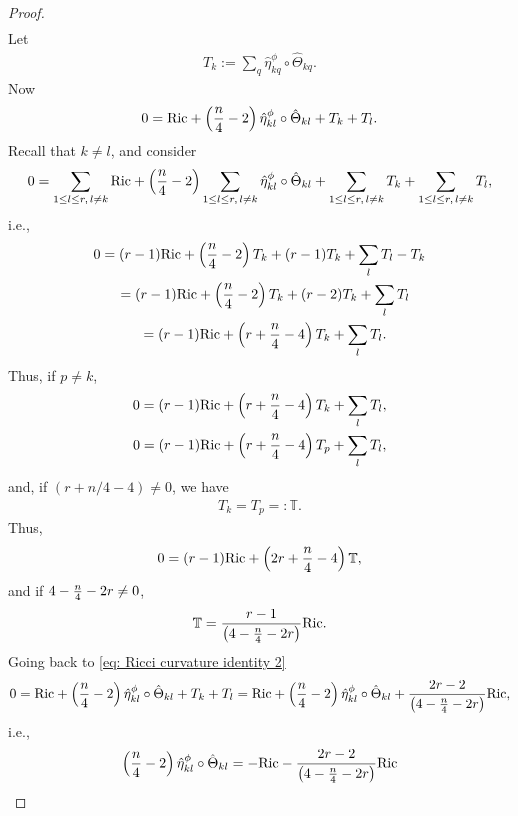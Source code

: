 \documentclass[pdftex]{sigma}
\numberwithin{equation}{section}
\begin{document}
\begin{proof}
\begin{gather*}
\end{gather*}
Let
\begin{gather*}T_k:=\sum_q \hat{\eta}^\phi_{kq}\circ\hat\Theta_{kq}.\end{gather*}
Now
\begin{gather}
0={\rm Ric} + \left({n\over 4}-2\right)\hat\eta_{kl}^\phi\circ\hat\Theta_{kl} + T_k + T_l . \label{eq: Ricci curvature identity 2}
\end{gather}
Recall that $k\not = l$, and consider
\begin{gather*}
0=\sum_{1\leq l\leq r,\,l\not= k} {\rm Ric} +\left({n\over 4}-2\right)\sum_{1\leq l\leq r,\,l\not= k}\hat\eta_{kl}^\phi\circ\hat\Theta_{kl}
 +\sum_{1\leq l\leq r,\,l\not= k} T_k + \sum_{1\leq l\leq r,\,l\not= k} T_l,
\end{gather*}
i.e.,
\begin{gather*}
0 = (r-1) {\rm Ric}+ \left({n\over 4}-2\right)T_k +(r-1) T_k + \sum_{l} T_l - T_k\\
\hphantom{0}{} = (r-1) {\rm Ric}+ \left({n\over 4}-2\right)T_k +(r-2) T_k + \sum_l T_l\\
\hphantom{0}{} = (r-1) {\rm Ric}+ \left(r+{n\over 4}-4\right)T_k + \sum_l T_l.
\end{gather*}
Thus, if $p\not =k$,
\begin{gather*}
0 =(r-1) {\rm Ric}+ \left(r+{n\over 4}-4\right)T_k + \sum_l T_l,\\
0 =(r-1) {\rm Ric}+ \left(r+{n\over 4}-4\right)T_p + \sum_l T_l,
\end{gather*}
and, if $(r+n/4-4)\not =0$, we have
\begin{gather*}T_k=T_p=:\mathbb{T}.\end{gather*}
Thus,
\begin{gather*}
0=(r-1) {\rm Ric}+\left(2r+{n\over 4}-4\right)\mathbb{T} ,
\end{gather*}
and if $4-{n\over 4}-2r\not=0$,
\begin{gather*}
 \mathbb{T}= {r-1\over \left(4-{n\over 4}-2r\right)} {\rm Ric} .
\end{gather*}
Going back to \eqref{eq: Ricci curvature identity 2}
\begin{gather*}
0 ={\rm Ric}+ \left({n\over 4}-2\right)\hat\eta_{kl}^\phi\circ\hat\Theta_{kl} +T_k + T_l =
{\rm Ric}+ \left({n\over 4}-2\right)\hat\eta_{kl}^\phi\circ\hat\Theta_{kl} +{2r-2\over \left(4-{n\over 4}-2r\right)} {\rm Ric} ,
\end{gather*}
i.e.,
\begin{gather*}
\left({n\over 4}-2\right)\hat\eta_{kl}^\phi\circ\hat\Theta_{kl} =-{\rm Ric} -{2r-2\over \left(4-{n\over 4}-2r\right)} {\rm Ric}

\end{gather*}
\end{proof}
\end{document}
